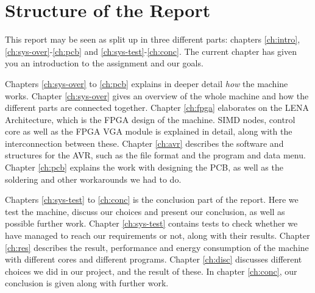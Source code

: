 \section{Structure of the Report}

This report may be seen as split up in three different parts: chapters
\ref{ch:intro}, \ref{ch:sys-over}-\ref{ch:pcb} and
\ref{ch:sys-test}-\ref{ch:conc}. The
current chapter has given you an introduction to the assignment and our goals.

Chapters \ref{ch:sys-over} to \ref{ch:pcb} explains in deeper detail {\em how}
the machine works. Chapter \ref{ch:sys-over} gives an overview of the whole
machine and how the different parts are connected together. Chapter
\ref{ch:fpga} elaborates on the \ac{LENA} Architecture, which is the \ac{FPGA}
design of the machine. \ac{SIMD} nodes, control core as well as the \ac{FPGA}
\ac{VGA} module is explained in detail, along with the interconnection between
these. Chapter \ref{ch:avr} describes the software and structures for the AVR,
such as the file format and the program and data menu. Chapter \ref{ch:pcb}
explains the work with designing the \ac{PCB}, as well as the soldering and
other workarounds we had to do.

Chapters \ref{ch:sys-test} to \ref{ch:conc} is the conclusion part of the
report. Here we test the machine, discuss our choices and present our
conclusion, as well as possible further work. Chapter \ref{ch:sys-test} contains
tests to check whether we have managed to reach our requirements or not, along
with their results. Chapter \ref{ch:res} describes the result, performance and
energy consumption of the machine with different cores and different
programs. Chapter \ref{ch:disc} discusses different choices we did in our
project, and the result of these. In chapter \ref{ch:conc}, our conclusion is
given along with further work.
